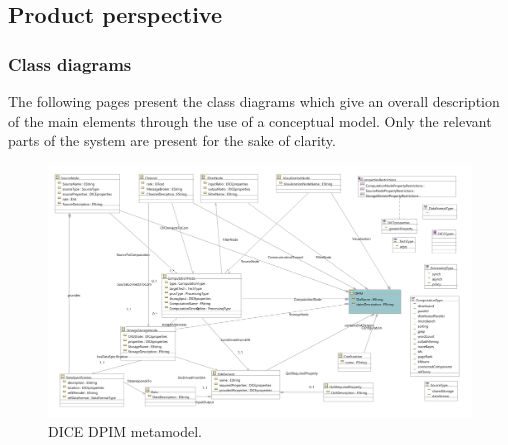 \subsection{Product perspective}
\subsubsection{Class diagrams}
The following pages present the class diagrams which give an overall description of the main elements through the use of a conceptual model. Only the relevant parts of the system are present for the sake of clarity.
\begin{figure}
\centering
\includegraphics[width=\textwidth]{Images/11.png}
\caption{\label{fig:metamodel}DICE DPIM metamodel.}
\end{figure}

\newpage
